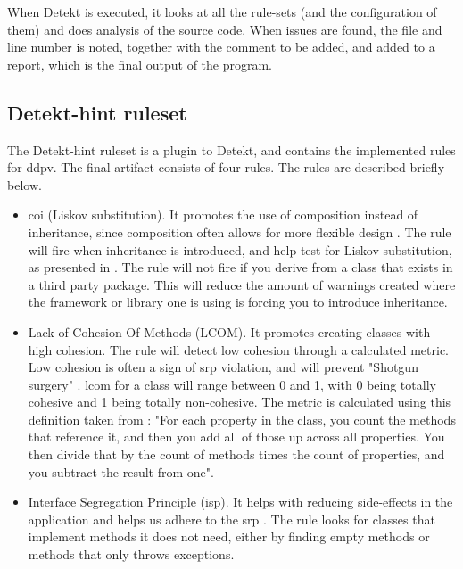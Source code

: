 \documentclass{report}
\begin{document}
When Detekt is executed, it looks at all the rule-sets (and the configuration of them) and does analysis of the source code. When issues are found, the file and line number is noted, together with the comment to be added, and added to a report, which is the final output of the program. 

\subsection{Detekt-hint ruleset}
The Detekt-hint ruleset is a plugin to Detekt, and contains the implemented rules for \gls{ddpv}. The final artifact consists of four rules. The rules are described briefly below.

\begin{itemize}
    \item\gls{coi} (Liskov substitution). It promotes the use of composition instead of inheritance, since composition often allows for more flexible design \cite{composition-over-inheritance-wiki}. The rule will fire when inheritance is introduced, and help test for Liskov substitution, as presented in \cite{composition-over-inheritance-stackoverflow}. The rule will not fire if you derive from a class that exists in a third party package. This will reduce the amount of warnings created where the framework or library one is using is forcing you to introduce inheritance.
    
    \item Lack of Cohesion Of Methods (LCOM). It promotes creating classes with high cohesion. The rule will detect low cohesion through a calculated metric. Low cohesion is often a sign of \gls{srp} violation, and will prevent "Shotgun surgery" \cite{lcomdescription}. \gls{lcom} for a class will range between 0 and 1, with 0 being totally cohesive and 1 being totally non-cohesive. The metric is calculated using this definition taken from \cite{lcomdescription}: "For each property in the class, you count the methods that reference it, and then you add all of those up across all properties. You then divide that by the count of methods times the count of properties, and you subtract the result from one".
    
    \item Interface Segregation Principle (\gls{isp}). It helps with reducing side-effects in the application and helps us adhere to the \gls{srp} \cite{isp-violation}. The rule looks for classes that implement methods it does not need, either by finding empty methods or methods that only throws exceptions.
    

\end{itemize}
\end{document}
